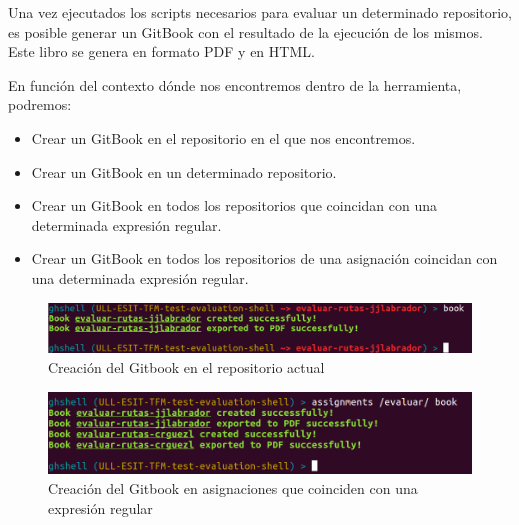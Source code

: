     Una vez ejecutados los scripts necesarios para evaluar un determinado repositorio, es posible generar un GitBook con el resultado de la ejecución de los mismos. Este libro se genera en formato PDF y en HTML.
\bigskip
    
    En función del contexto dónde nos encontremos dentro de la herramienta, podremos:
    \begin{itemize}
    	\item Crear un GitBook en el repositorio en el que nos encontremos.
    	\item Crear un GitBook en un determinado repositorio.
	    \item Crear un GitBook en todos los repositorios que coincidan con una determinada expresión regular.
	    \item Crear un GitBook en todos los repositorios de una asignación coincidan con una determinada expresión regular.
    \end{itemize}
        
        \begin{figure}[H]
		\begin{center}
		\includegraphics[width=1\textwidth]{images/ghshell8-3}
		\caption{Creación del Gitbook en el repositorio actual}
		\label{fig:ghshell8-3}
		\end{center}
		\end{figure}
		
        \begin{figure}[H]
		\begin{center}
		\includegraphics[width=1\textwidth]{images/ghshell8-1}
		\caption{Creación del Gitbook en asignaciones que coinciden con una expresión regular}
		\label{fig:ghshell8-1}
		\end{center}
		\end{figure}	
		
